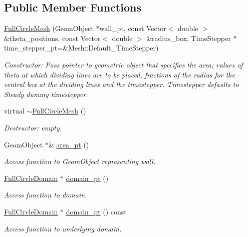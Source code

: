 \subsection*{Public Member Functions}
\begin{DoxyCompactItemize}
\item 
\hyperlink{classoomph_1_1FullCircleMesh_acf4dee3c3072751597d7897176b1e7f1}{Full\+Circle\+Mesh} (Geom\+Object $\ast$wall\+\_\+pt, const Vector$<$ double $>$ \&theta\+\_\+positions, const Vector$<$ double $>$ \&radius\+\_\+box, Time\+Stepper $\ast$time\+\_\+stepper\+\_\+pt=\&Mesh\+::\+Default\+\_\+\+Time\+Stepper)
\begin{DoxyCompactList}\small\item\em Constructor\+: Pass pointer to geometric object that specifies the area; values of theta at which dividing lines are to be placed, fractions of the radius for the central box at the dividing lines and the timestepper. Timestepper defaults to Steady dummy timestepper. \end{DoxyCompactList}\item 
virtual \hyperlink{classoomph_1_1FullCircleMesh_a7acf128e8eeaefcd79b5b3cd5e9cbaa9}{$\sim$\+Full\+Circle\+Mesh} ()
\begin{DoxyCompactList}\small\item\em Destructor\+: empty. \end{DoxyCompactList}\item 
Geom\+Object $\ast$\& \hyperlink{classoomph_1_1FullCircleMesh_a0ee479af0a6562231d7a7d1c5533beb9}{area\+\_\+pt} ()
\begin{DoxyCompactList}\small\item\em Access function to Geom\+Object representing wall. \end{DoxyCompactList}\item 
\hyperlink{classoomph_1_1FullCircleDomain}{Full\+Circle\+Domain} $\ast$ \hyperlink{classoomph_1_1FullCircleMesh_aade9e5e2a9d65f8b7f5d041da4536d99}{domain\+\_\+pt} ()
\begin{DoxyCompactList}\small\item\em Access function to domain. \end{DoxyCompactList}\item 
\hyperlink{classoomph_1_1FullCircleDomain}{Full\+Circle\+Domain} $\ast$ \hyperlink{classoomph_1_1FullCircleMesh_ae912045c32ae004812d61a58161e531f}{domain\+\_\+pt} () const
\begin{DoxyCompactList}\small\item\em Access function to underlying domain. \end{DoxyCompactList}\end{DoxyCompactItemize}
